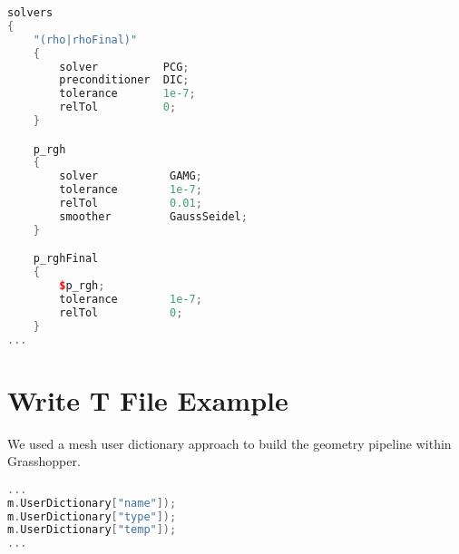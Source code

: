 \begin{theappendices}
\begin{lstlisting}[language=c++, caption=OF dictiorary in $system/Brick/fvSolution$]
solvers
{
    "(rho|rhoFinal)"
    {
        solver          PCG;
        preconditioner  DIC;
        tolerance       1e-7;
        relTol          0;
    }

    p_rgh
    {
        solver           GAMG;
        tolerance        1e-7;
        relTol           0.01;
        smoother         GaussSeidel;
    }

    p_rghFinal
    {
        $p_rgh;
        tolerance        1e-7;
        relTol           0;
    }
...
\end{lstlisting}




\singlespacing
\chapter{Write T File Example}

We used a mesh user dictionary approach to build the geometry pipeline within Grasshopper.

\begin{lstlisting}[language=c++, caption= Code to handle OF dictionary in $0/Brick/T$]
...
m.UserDictionary["name"]);
m.UserDictionary["type"]);
m.UserDictionary["temp"]);
...
\end{lstlisting}







\normalsize
\singlespacing

\end{theappendices}
